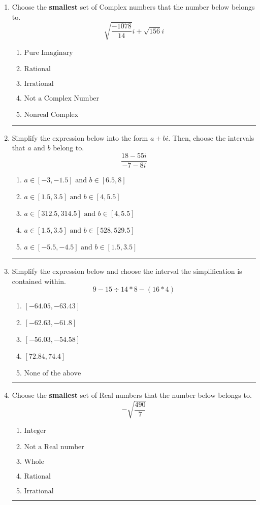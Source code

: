 \documentclass[14pt]{extbook}
\newcommand{\litem}[1]{\item#1\hspace*{-1cm}\rule{\textwidth}{0.4pt}}
\begin{document}
\begin{enumerate}
{\begin{enumerate}[label=\Alph*.]
\end{enumerate} }
\litem{
Choose the \textbf{smallest} set of Complex numbers that the number below belongs to.\[ \sqrt{\frac{-1078}{14}} i+\sqrt{156}i \]\begin{enumerate}[label=\Alph*.]
\item \( \text{Pure Imaginary} \)
\item \( \text{Rational} \)
\item \( \text{Irrational} \)
\item \( \text{Not a Complex Number} \)
\item \( \text{Nonreal Complex} \)

\end{enumerate} }
\litem{
Simplify the expression below into the form $a+bi$. Then, choose the intervals that $a$ and $b$ belong to.\[ \frac{18 - 55 i}{-7 - 8 i} \]\begin{enumerate}[label=\Alph*.]
\item \( a \in [-3, -1.5] \text{ and } b \in [6.5, 8] \)
\item \( a \in [1.5, 3.5] \text{ and } b \in [4, 5.5] \)
\item \( a \in [312.5, 314.5] \text{ and } b \in [4, 5.5] \)
\item \( a \in [1.5, 3.5] \text{ and } b \in [528, 529.5] \)
\item \( a \in [-5.5, -4.5] \text{ and } b \in [1.5, 3.5] \)

\end{enumerate} }
\litem{
Simplify the expression below and choose the interval the simplification is contained within.\[ 9 - 15 \div 14 * 8 - (16 * 4) \]\begin{enumerate}[label=\Alph*.]
\item \( [-64.05, -63.43] \)
\item \( [-62.63, -61.8] \)
\item \( [-56.03, -54.58] \)
\item \( [72.84, 74.4] \)
\item \( \text{None of the above} \)

\end{enumerate} }
\litem{
Choose the \textbf{smallest} set of Real numbers that the number below belongs to.\[ -\sqrt{\frac{490}{7}} \]\begin{enumerate}[label=\Alph*.]
\item \( \text{Integer} \)
\item \( \text{Not a Real number} \)
\item \( \text{Whole} \)
\item \( \text{Rational} \)
\item \( \text{Irrational} \)


\end{enumerate}}
\end{enumerate}
\end{document}
